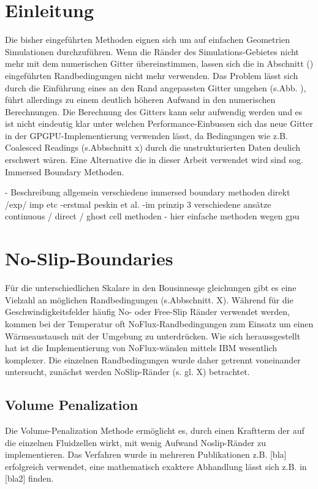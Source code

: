 \section{Einleitung}
Die bisher eingeführten Methoden eignen sich um auf einfachen Geometrien Simulationen durchzuführen.
Wenn die Ränder des Simulations-Gebietes nicht mehr mit dem numerischen Gitter übereinstimmen, lassen
sich die in Abschnitt () eingeführten Randbedingungen nicht mehr verwenden.
Das Problem lässt sich durch die Einführung eines an den Rand angepassten Gitter umgehen (s.Abb. \label{fig:f1}),
führt allerdings zu einem deutlich höheren Aufwand in den numerischen Berechnungen.
Die Berechnung des Gitters kann sehr aufwendig werden und es ist nicht eindeutig klar unter welchen
Performance-Einbussen sich das neue Gitter in der GPGPU-Implementierung verwenden lässt, da Bedingungen wie
z.B. Coalesced Readings  (s.Abbschnitt x) durch die unstrukturierten Daten deulich erschwert wären.
Eine Alternative die in dieser Arbeit verwendet wird sind  sog. Immersed Boundary Methoden.


- Beschreibung allgemein verschiedene immersed boundary methoden direkt /exp/ imp etc
    -erstmal peskin et al.
    -im prinzip 3 verschiedene ansätze continuous / direct /  ghost cell methoden
    - hier einfache methoden wegen gpu


\newpage

\section{No-Slip-Boundaries}
Für die unterschiedlichen Skalare in den Bousinnesqe gleichungen gibt es eine Vielzahl an möglichen Randbedingungen (s.Abbschnitt. X).
Während für die Geschwindigkeitsfelder häufig No- oder Free-Slip Ränder verwendet werden,
kommen bei der Temperatur oft NoFlux-Randbedingungen zum Einsatz um einen Wärmeaustausch mit der Umgebung zu unterdrücken.
Wie sich heraussgestellt hat ist die Implementierung von NoFlux-wänden mittels IBM wesentlich komplexer.
Die einzelnen Randbedingungen wurde daher getrennt voneinander untersucht, zunächst werden NoSlip-Ränder (s. gl. X) betrachtet.

\subsection{Volume Penalization}
Die Volume-Penalization Methode ermöglicht es, durch einen Kraftterm der auf die einzelnen Fluidzellen wirkt, mit wenig Aufwand Noslip-Ränder zu implementieren.
Das Verfahren wurde in mehreren Publikationen z.B. [bla] erfolgreich verwendet, eine mathematisch exaktere Abhandlung lässt sich z.B. in [bla2] finden.

